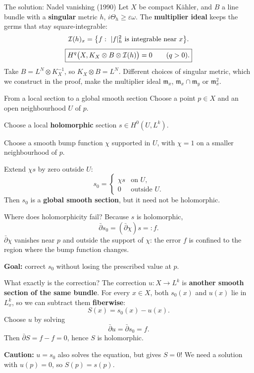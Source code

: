 \begin{frame}{The solution: Nadel vanishing (1990)}
Let \(X\) be compact Kähler, and \(B\) a line bundle with a \textbf{singular} metric \(h\), \(i\Theta_h\ge\varepsilon\omega\).
The \textbf{multiplier ideal} keeps the germs that stay square-integrable:
\[
\cI(h)_x=\bigl\{f:\ |f|_h^2\ \text{is integrable near}\ x\bigr\}.
\]
\[
\boxed{H^q\bigl(X,K_X\otimes B\otimes\mathcal I(h)\bigr)=0\qquad(q>0).}
\]
Take \(B=L^N\otimes K_X^{-1}\), so \(K_X\otimes B=L^N\).
Different choices of singular metric, which we construct in the proof, make the multiplier ideal
\(\mathfrak m_x\), \(\mathfrak m_x\cap\mathfrak m_y\) or \(\mathfrak m_x^2\).
\end{frame}



\appendix
\begin{frame}{From a local section to a global smooth section}
Choose a point \(p\in X\) and an open neighbourhood \(U\) of \(p\).
\par\medskip
Choose a local \textbf{holomorphic} section \(s\in H^0(U,L^k)\).
\par\medskip
Choose a smooth bump function \(\chi\) supported in \(U\), with
\(\chi=1\) on a smaller neighbourhood of \(p\).
\par\medskip
Extend \(\chi s\) by zero outside \(U\):
\[
s_0=\begin{cases}\chi s&\text{on }U,\\0&\text{outside }U.\end{cases}
\]
Then \(s_0\) is a \textbf{global smooth section}, but it need not be holomorphic.
\end{frame}

\begin{frame}{Where does holomorphicity fail?}
Because \(s\) is holomorphic,
\[
\bar\partial s_0=(\bar\partial\chi)s=:f.
\]
\(\bar\partial\chi\) vanishes near \(p\) and outside the support
of \(\chi\): the error \(f\) is confined to the region where
the bump function changes.
\par\bigskip
\textbf{Goal:} correct \(s_0\) without losing the prescribed value at \(p\).
\end{frame}

\begin{frame}{What exactly is the correction?}
The correction \(u:X\to L^k\) is \textbf{another smooth section of the same bundle}.
For every \(x\in X\), both \(s_0(x)\) and \(u(x)\) lie in \(L_x^k\),
so we can subtract them \textbf{fiberwise}:
\[
S(x)=s_0(x)-u(x).
\]
Choose \(u\) by solving
\[
\bar\partial u=\bar\partial s_0=f.
\]
Then \(\bar\partial S=f-f=0\), hence \(S\) is holomorphic.
\par\medskip
\textbf{Caution:} \(u=s_0\) also solves the equation, but gives \(S=0\)!
We need a solution with \(u(p)=0\), so \(S(p)=s(p)\).
\end{frame}

